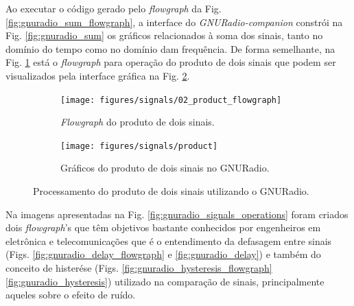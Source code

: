 \documentclass[
  12pt,				%
  openright,			%
  twoside,			%
  a4paper,			%
  english,			%
  french,				%
  spanish,			%
  brazil,				%
  ]{abntex2}
\begin{document}
Ao executar o código gerado pelo \textit{flowgraph} da Fig. \ref{fig:gnuradio_sum_flowgraph}, a interface do \textit{GNURadio-companion} constrói na Fig. \ref{fig:gnuradio_sum} os gráficos
relacionados à soma dos sinais, tanto no domínio do tempo como no domínio dam frequência. De forma semelhante, na Fig. \ref{fig:gnuradio_product_flowgraph} está o \textit{flowgraph} para
operação do produto de dois sinais que podem ser visualizados pela interface gráfica na Fig. \ref{fig:gnuradio_product}.

\begin{figure}[!htb]
  \centering
  \begin{subfigure}[b]{0.8\linewidth}
    \centering
    \caption{\textit{Flowgraph} do produto de dois sinais.}
    \texttt{[image: figures/signals/02\_product\_flowgraph]}
    \label{fig:gnuradio_product_flowgraph}
  \end{subfigure}

  \begin{subfigure}[b]{0.8\linewidth}
    \centering
    \caption{Gráficos do produto de dois sinais no GNURadio.}
    \texttt{[image: figures/signals/product]}
    \label{fig:gnuradio_product}
  \end{subfigure}
  \caption{Processamento do produto de dois sinais utilizando o GNURadio.}
  \label{fig:gnuradio_signals_product}
\end{figure}

Na imagens apresentadas na Fig. \ref{fig:gnuradio_signals_operations} foram criados dois \textit{flowgraph}'s que têm objetivos bastante conhecidos
por engenheiros em eletrônica e telecomunicações que é o entendimento da defasagem entre sinais (Figs. \ref{fig:gnuradio_delay_flowgraph} e \ref{fig:gnuradio_delay})
e também do conceito de histerése (Figs. \ref{fig:gnuradio_hysteresis_flowgraph} \ref{fig:gnuradio_hysteresis}) utilizado na comparação de sinais,
principalmente aqueles sobre o efeito de ruído.
\end{document}
